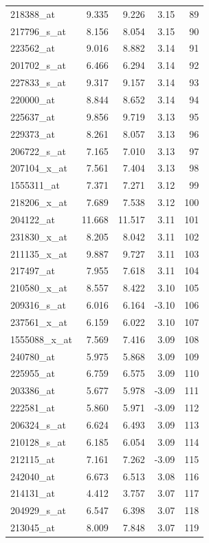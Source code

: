 \begin{footnotesize}
\begin{longtable}{lrrrr}
218388\_at & 9.335 & 9.226 & 3.15 & 89 \\
217796\_s\_at & 8.156 & 8.054 & 3.15 & 90 \\
223562\_at & 9.016 & 8.882 & 3.14 & 91 \\
201702\_s\_at & 6.466 & 6.294 & 3.14 & 92 \\
227833\_s\_at & 9.317 & 9.157 & 3.14 & 93 \\
220000\_at & 8.844 & 8.652 & 3.14 & 94 \\
225637\_at & 9.856 & 9.719 & 3.13 & 95 \\
229373\_at & 8.261 & 8.057 & 3.13 & 96 \\
206722\_s\_at & 7.165 & 7.010 & 3.13 & 97 \\
207104\_x\_at & 7.561 & 7.404 & 3.13 & 98 \\
1555311\_at & 7.371 & 7.271 & 3.12 & 99 \\
218206\_x\_at & 7.689 & 7.538 & 3.12 & 100 \\
204122\_at & 11.668 & 11.517 & 3.11 & 101 \\
231830\_x\_at & 8.205 & 8.042 & 3.11 & 102 \\
211135\_x\_at & 9.887 & 9.727 & 3.11 & 103 \\
217497\_at & 7.955 & 7.618 & 3.11 & 104 \\
210580\_x\_at & 8.557 & 8.422 & 3.10 & 105 \\
209316\_s\_at & 6.016 & 6.164 & -3.10 & 106 \\
237561\_x\_at & 6.159 & 6.022 & 3.10 & 107 \\
1555088\_x\_at & 7.569 & 7.416 & 3.09 & 108 \\
240780\_at & 5.975 & 5.868 & 3.09 & 109 \\
225955\_at & 6.759 & 6.575 & 3.09 & 110 \\
203386\_at & 5.677 & 5.978 & -3.09 & 111 \\
222581\_at & 5.860 & 5.971 & -3.09 & 112 \\
206324\_s\_at & 6.624 & 6.493 & 3.09 & 113 \\
210128\_s\_at & 6.185 & 6.054 & 3.09 & 114 \\
212115\_at & 7.161 & 7.262 & -3.09 & 115 \\
242040\_at & 6.673 & 6.513 & 3.08 & 116 \\
214131\_at & 4.412 & 3.757 & 3.07 & 117 \\
204929\_s\_at & 6.547 & 6.398 & 3.07 & 118 \\
213045\_at & 8.009 & 7.848 & 3.07 & 119 \\

\end{longtable}
\end{footnotesize}
